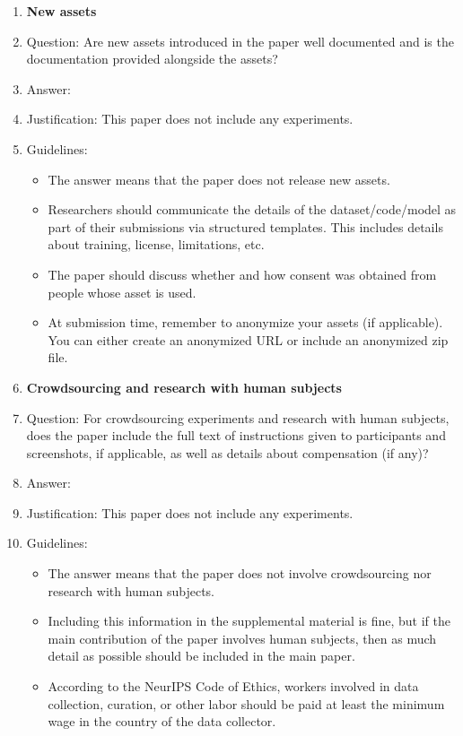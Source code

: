 \documentclass{article}
\theoremstyle{definition}
\theoremstyle{remark}
\begin{document}
\begin{enumerate}
\item {\bf New assets}
    \item[] Question: Are new assets introduced in the paper well documented and is the documentation provided alongside the assets?
    \item[] Answer: \answerNA{}%
    \item[] Justification: This paper does not include any experiments.
    \item[] Guidelines:
    \begin{itemize}
        \item The answer \answerNA{} means that the paper does not release new assets.
        \item Researchers should communicate the details of the dataset\slash code\slash model as part of their submissions via structured templates. This includes details about training, license, limitations, etc. 
        \item The paper should discuss whether and how consent was obtained from people whose asset is used.
        \item At submission time, remember to anonymize your assets (if applicable). You can either create an anonymized URL or include an anonymized zip file.
    \end{itemize}

\item {\bf Crowdsourcing and research with human subjects}
    \item[] Question: For crowdsourcing experiments and research with human subjects, does the paper include the full text of instructions given to participants and screenshots, if applicable, as well as details about compensation (if any)? 
    \item[] Answer: \answerNA{} %
    \item[] Justification: This paper does not include any experiments.
    \item[] Guidelines:
    \begin{itemize}
        \item The answer \answerNA{} means that the paper does not involve crowdsourcing nor research with human subjects.
        \item Including this information in the supplemental material is fine, but if the main contribution of the paper involves human subjects, then as much detail as possible should be included in the main paper. 
        \item According to the NeurIPS Code of Ethics, workers involved in data collection, curation, or other labor should be paid at least the minimum wage in the country of the data collector. 
    \end{itemize}


\end{enumerate}
\end{document}
